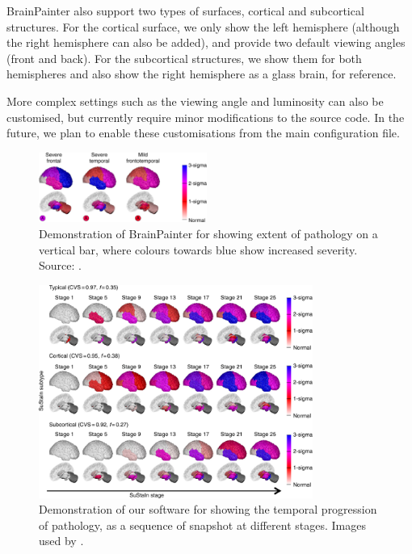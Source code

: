 \documentclass[final,times,twocolumn,authoryear]{elsarticle}
\begin{document}
BrainPainter also support two types of surfaces, cortical and subcortical structures. For the cortical surface, we only show the left hemisphere (although the right hemisphere can also be added), and provide two default viewing angles (front and back). For the subcortical structures, we show them for both hemispheres and also show the right hemisphere as a glass brain, for reference.

More complex settings such as the viewing angle and luminosity can also be customised, but currently require minor modifications to the source code. In the future, we plan to enable these customisations from the main configuration file.




\begin{figure}
 \includegraphics[width=0.49\textwidth]{images/young_3brains.png}
 \caption{Demonstration of BrainPainter for showing extent of pathology on a vertical bar, where colours towards blue show increased severity. Source: \cite{young2018uncovering}.}
 \label{fig:youngDegree}
\end{figure}

\begin{figure}[htp]
\centering
 \includegraphics[width=0.8\textwidth, trim=20 0 0 220, clip]{images/young_progression.png}
 \caption{Demonstration of our software for showing the temporal progression of pathology, as a sequence of snapshot at different stages. Images used by
 \cite{young2018uncovering}.}
  \label{fig:youngProg}
\end{figure}
\end{document}
